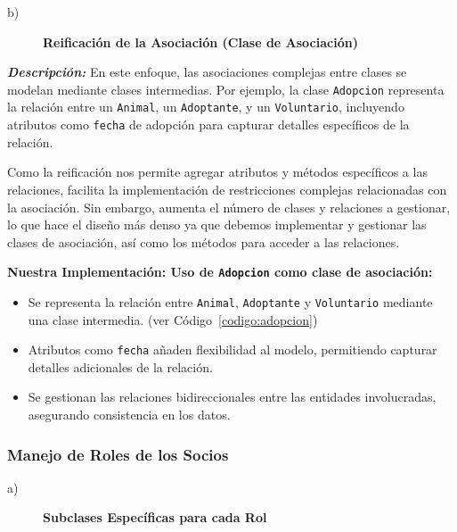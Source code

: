 \begin{description}
    \item[b)] \textbf{Reificación de la Asociación (Clase de Asociación)}
\end{description}

\textit{\textbf{Descripción:}}  
En este enfoque, las asociaciones complejas entre clases se modelan mediante clases 
intermedias. Por ejemplo, la clase \texttt{Adopcion} representa la relación entre un 
\texttt{Animal}, un \texttt{Adoptante}, y un \texttt{Voluntario}, incluyendo atributos 
como \texttt{fecha} de adopción para capturar detalles específicos de la relación.\par
\vspace{0.15cm}
Como la reificación nos permite agregar atributos y métodos específicos a las relaciones,
facilita la implementación de restricciones complejas relacionadas con la asociación.
Sin embargo, aumenta el número de clases y relaciones a gestionar, lo que hace el diseño más denso
ya que debemos implementar y gestionar las clases de asociación, así como los métodos para 
acceder a las relaciones.\par
\vspace{0.15cm}

\textbf{Nuestra Implementación: Uso de \texttt{Adopcion} como clase de asociación:}
\begin{itemize}
    \item Se representa la relación entre \texttt{Animal}, \texttt{Adoptante} y 
    \texttt{Voluntario} mediante una clase intermedia. (ver Código~\ref{codigo:adopcion})
    \item Atributos como \texttt{fecha} añaden flexibilidad al modelo, permitiendo 
    capturar detalles adicionales de la relación.
    \item Se gestionan las relaciones bidireccionales entre las entidades involucradas, 
    asegurando consistencia en los datos.
\end{itemize}




\subsubsection{Manejo de Roles de los Socios}

\begin{description}
    \item[a)] \textbf{Subclases Específicas para cada Rol}
\end{description}


